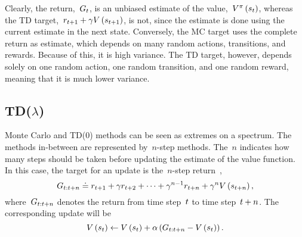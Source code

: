 Clearly, the return,~${G_{t}}$, is an unbiased estimate of the value,~${V^{\pi}\left(s_{t}\right)}$, whereas the TD target,~${\randomreward_{\timestep+1}+\discount\estimatestatevalue\left(\randomstate_{\timestep+1}\right)}$, is not, since the estimate is done using the current estimate in the next state. Conversely, the MC target uses the complete return as estimate, which depends on many random actions, transitions, and rewards. Because of this, it is high variance. The TD target, however, depends solely on one random action, one random transition, and one random reward, meaning that it is much lower variance.

\subsection{TD(\texorpdfstring{$\lambda$}{lambda})} \label{sec:td_lambda}
Monte Carlo and TD(0) methods can be seen as extremes on a spectrum. The methods in-between are represented by~${n}$-step methods. The~${n}$ indicates how many steps should be taken before updating the estimate of the value function. In this case, the target for an update is the~${n}$-step return~\cite{watkins1989learning},
\begin{equation}
	G_{t:t+n}\doteq r_{t+1}+\gamma r_{t+2}+\dots+\gamma^{n-1}r_{t+n}+\gamma^{n}V\left(s_{t+n}\right),
\end{equation}
where~${G_{t:t+n}}$ denotes the return from time step~${t}$ to time step~${t+n}$. The corresponding update will be
\begin{equation}
	\estimatestatevalue\left(\randomstate_{\timestep}\right)\gets\estimatestatevalue\left(\randomstate_{\timestep}\right)+\robbinsmonro\left(\return_{\timestep:\timestep+n}-\estimatestatevalue\left(\randomstate_{\timestep}\right)\right).
\end{equation}

